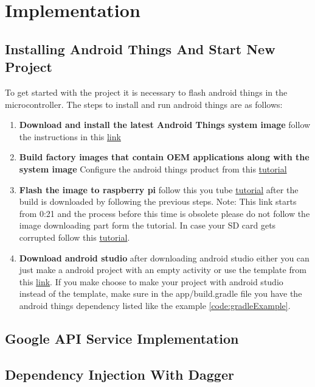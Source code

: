 \newpage
\chapter{Implementation}
    \section{Installing Android Things And Start New Project}
        To get started with the project it is necessary to flash android things in the
        microcontroller. The steps to install and run android things are as follows:
        \begin{enumerate}
            \item 
                \textbf{Download and install the latest Android Things system image}
                    follow the instructions in this \href{https://developer.android.com/things/console/create.html}
                    {link}
            \item 
                \textbf{Build factory images that contain OEM applications along with the system image}
                        Configure the android things product from this \href{https://developer.android.com/things/console/configure.html}
                        {tutorial}
            \item 
            \textbf{Flash the image to raspberry pi}
                follow this you tube
                \href{https://youtu.be/9_ePSCjrQsQ?t=21}{tutorial} after the build is downloaded by following the previous steps.
                Note: This link starts from 0:21 and the process before this time is obsolete
                please do not follow the image downloading part form the tutorial.
                In case your SD card gets corrupted follow this \href{https://youtu.be/cguJpeDRfbc?list=PLr1nMHB-ifhF_3Q92jFqGUgqfABwFIKgZ}
                {tutorial}.               
            \item 
                \textbf{Download android studio}
                    after downloading android studio either you can just make a android project 
                    with an empty activity or use the template from this \href{https://github.com/androidthings/new-project-template}
                    {link}.
                    If you make choose to make your project with android studio instead of the
                    template, make sure in the app/build.gradle file you have the android things
                    dependency listed like the example \ref{code:gradleExample}.                        
        \end{enumerate}
    \section{Google API Service Implementation}
    \section{Dependency Injection With Dagger}













